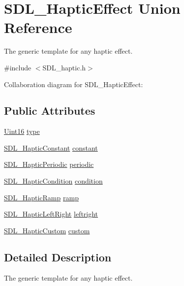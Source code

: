 \hypertarget{union_s_d_l___haptic_effect}{\section{S\-D\-L\-\_\-\-Haptic\-Effect Union Reference}
\label{union_s_d_l___haptic_effect}
}


The generic template for any haptic effect.  




{\ttfamily \#include $<$S\-D\-L\-\_\-haptic.\-h$>$}



Collaboration diagram for S\-D\-L\-\_\-\-Haptic\-Effect\-:
\subsection*{Public Attributes}
\begin{DoxyCompactItemize}
\item 
\hyperlink{_s_d_l__stdinc_8h_a31fcc0a076c9068668173ee26d33e42b}{Uint16} \hyperlink{union_s_d_l___haptic_effect_a5ff6cfd8da91537091e9a6c2108cb179}{type}
\item 
\hyperlink{struct_s_d_l___haptic_constant}{S\-D\-L\-\_\-\-Haptic\-Constant} \hyperlink{union_s_d_l___haptic_effect_ac435275e9683d6cc5d65b9c7cc2ec659}{constant}
\item 
\hyperlink{struct_s_d_l___haptic_periodic}{S\-D\-L\-\_\-\-Haptic\-Periodic} \hyperlink{union_s_d_l___haptic_effect_a8320ec4db6ec1dc1d30feb62ee2a2f04}{periodic}
\item 
\hyperlink{struct_s_d_l___haptic_condition}{S\-D\-L\-\_\-\-Haptic\-Condition} \hyperlink{union_s_d_l___haptic_effect_aa8fdd1ba202ccd7e61f48ef9977080d2}{condition}
\item 
\hyperlink{struct_s_d_l___haptic_ramp}{S\-D\-L\-\_\-\-Haptic\-Ramp} \hyperlink{union_s_d_l___haptic_effect_a1d32ef4c2d1cc89dc938b392f6ad81bd}{ramp}
\item 
\hyperlink{struct_s_d_l___haptic_left_right}{S\-D\-L\-\_\-\-Haptic\-Left\-Right} \hyperlink{union_s_d_l___haptic_effect_a3c254b81c1ff41c7888eee0cd0076a12}{leftright}
\item 
\hyperlink{struct_s_d_l___haptic_custom}{S\-D\-L\-\_\-\-Haptic\-Custom} \hyperlink{union_s_d_l___haptic_effect_a0b2d2af28c515cc39896b2b7c23019d2}{custom}
\end{DoxyCompactItemize}


\subsection{Detailed Description}
The generic template for any haptic effect. 

